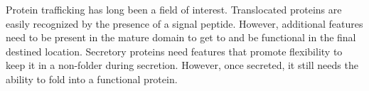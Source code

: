 Protein trafficking has long been a field of interest.
Translocated proteins are easily recognized  by the presence of a signal peptide.
However, additional features need to be present in the mature domain to get to and be functional in the final destined location. 
Secretory proteins need features that promote flexibility to keep it in a non-folder during secretion.
However, once secreted, it still needs the ability to fold into a functional protein.
